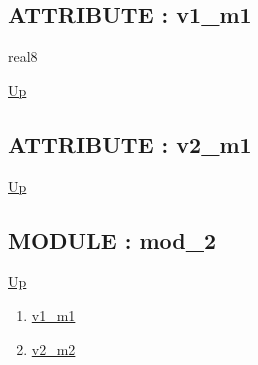 \subsection*{ATTRIBUTE : v1\_m1}
\hypertarget{ecldoc:intest.inintest.example_2.mod_1.v1_m1}{}
\par
\begin{minipage}[t]{\textwidth}
\begin{flushleft}
real8  
\end{flushleft}
\end{minipage}
\hyperlink{ecldoc:intest.inintest.example_2.mod_1}{Up} \\
\par
\par
\subsection*{ATTRIBUTE : v2\_m1}
\hypertarget{ecldoc:intest.inintest.example_2.mod_1.v2_m1}{}
\par
\begin{minipage}[t]{\textwidth}
\begin{flushleft}
  
\end{flushleft}
\end{minipage}
\hyperlink{ecldoc:intest.inintest.example_2.mod_1}{Up} \\
\par
\par

\subsection*{MODULE : mod\_2}
\hypertarget{ecldoc:intest.inintest.example_2.mod_2}{}
\par
\begin{minipage}[t]{\textwidth}
\begin{flushleft}
  
\end{flushleft}
\end{minipage}
\hyperlink{ecldoc:intest.inintest.example_2}{Up} \\
\par
\par
\begin{enumerate}
\item \hyperlink{ecldoc:intest.inintest.example_2.mod_2.v1_m1}{v1\_m1}
\item \hyperlink{ecldoc:intest.inintest.example_2.mod_2.v2_m2}{v2\_m2}
\end{enumerate}

